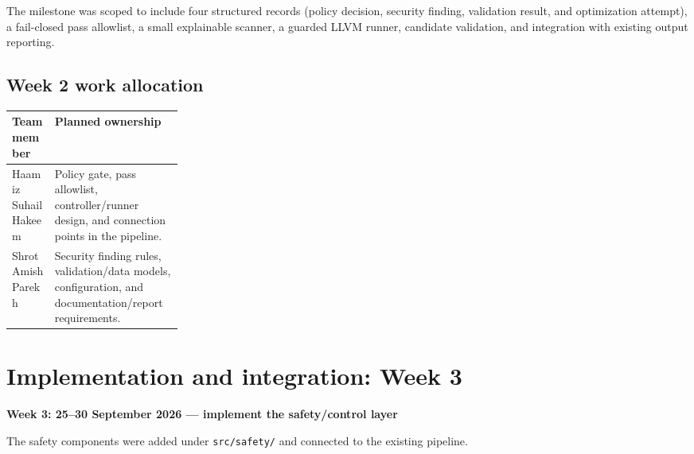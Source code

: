 \documentclass[11pt]{article}
\begin{document}
\begin{center}
\end{center}

The milestone was scoped to include four structured records (policy decision, security finding, validation result, and optimization attempt), a fail-closed pass allowlist, a small explainable scanner, a guarded LLVM runner, candidate validation, and integration with existing output reporting.

\subsection*{Week 2 work allocation}
\begin{tabularx}{\linewidth}{@{}p{0.25\linewidth}Y@{}}
\toprule
\textbf{Team member} & \textbf{Planned ownership} \\
\midrule
Haamiz Suhail Hakeem & Policy gate, pass allowlist, controller/runner design, and connection points in the pipeline. \\
Shrot Amish Parekh & Security finding rules, validation/data models, configuration, and documentation/report requirements. \\
\bottomrule
\end{tabularx}

\section{Implementation and integration: Week 3}
\textbf{Week 3: 25--30 September 2026 --- implement the safety/control layer}

The safety components were added under \texttt{src/safety/} and connected to the existing pipeline.
\end{document}
